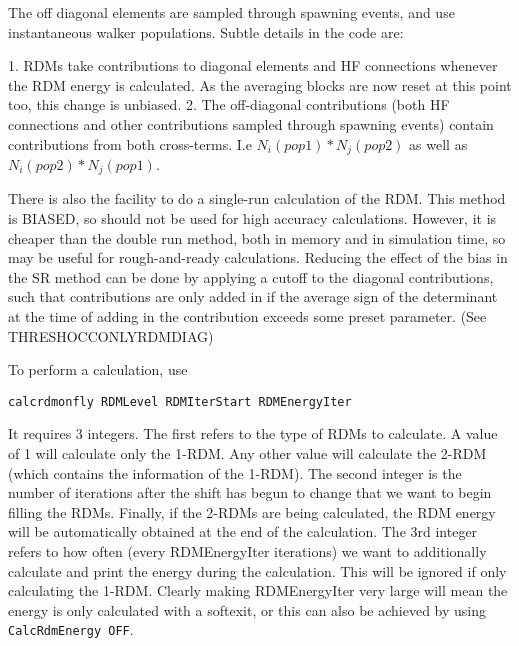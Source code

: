 \documentclass[a4paper,notitlepage]{scrreprt}
\let\code\lstinline
\begin{document}
The off diagonal elements are sampled through spawning events, and use instantaneous walker populations.
Subtle details in the code are:

1. RDMs take contributions to diagonal elements and HF connections whenever the RDM energy is calculated.
   As the averaging blocks are now reset at this point too, this change is unbiased.
2. The off-diagonal contributions (both HF connections and other contributions sampled through spawning
   events) contain contributions from both cross-terms. I.e $N_i(pop1)*N_j(pop2)$ as well as
   $N_i(pop2)*N_j(pop1)$.

There is also the facility to do a single-run calculation of the RDM.  This method is BIASED, so should
not be used for high accuracy calculations.  However, it is cheaper than the double run method, both in
memory and in simulation time, so may be useful for rough-and-ready calculations.
Reducing the effect of the bias in the SR method can be done by applying a cutoff to the diagonal contributions, such that
contributions are only added in if the average sign of the determinant at the time of adding in the contribution exceeds
some preset parameter.  (See THRESHOCCONLYRDMDIAG)

To perform a calculation, use
    \begin{lstlisting}[gobble=4]
		calcrdmonfly RDMLevel RDMIterStart RDMEnergyIter
    \end{lstlisting}

    It requires 3 integers.
    The first refers to the type of RDMs to calculate.  A value of 1 will calculate only the 1-RDM.  Any other
    value will calculate the 2-RDM (which contains the information of the 1-RDM).  The second integer
    is the number of iterations after the shift has begun to change that we want to begin filling the RDMs.
    Finally, if the 2-RDMs are being calculated, the RDM energy will be automatically obtained at the
    end of the calculation.  The 3rd integer refers to how often (every RDMEnergyIter iterations) we want
    to additionally calculate and print the energy during the calculation.  This will be ignored if only
    calculating the 1-RDM.
    Clearly making RDMEnergyIter very large will mean the energy is only calculated with a softexit, or this can
    also be achieved by using \code{CalcRdmEnergy OFF}.
\end{document}
